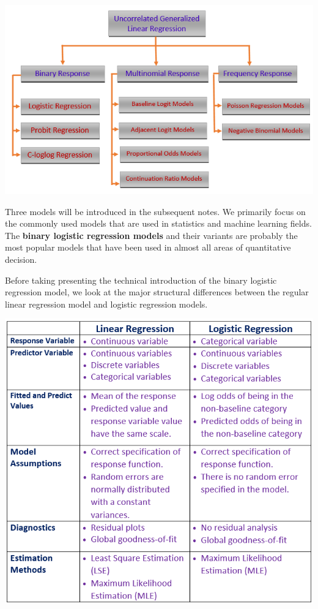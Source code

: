 \documentclass[
]{book}
\begin{document}
\begin{center}\includegraphics[width=0.95\linewidth]{img06/w06-GLMClassification} \end{center}

\hfill\break

Three models will be introduced in the subsequent notes. We primarily focus on the commonly used models that are used in statistics and machine learning fields. The \textbf{binary logistic regression models} and their variants are probably the most popular models that have been used in almost all areas of quantitative decision.

Before taking presenting the technical introduction of the binary logistic regression model, we look at the major structural differences between the regular linear regression model and logistic regression models.

\begin{center}\includegraphics[width=0.8\linewidth]{img06/w06-LMvsGLM} \end{center}
\end{document}
